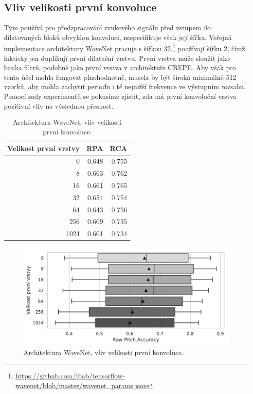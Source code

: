 \subsection{Vliv velikosti první konvoluce}

Tým \cite{Oord2016} používá pro předzpracování zvukového signálu před vstupem do dilatovaných bloků obvyklou konvoluci, nespecifikuje však její šířku. Veřejná implementace architektury WaveNet pracuje s šířkou 32.\footnote{\url{https://github.com/ibab/tensorflow-wavenet/blob/master/wavenet_params.json}} \cite{Martak2018} používají šířku 2, čímž fakticky jen duplikují první dilatační vrstvu. První vrstva může sloužit jako banka filtrů, podobně jako první vrstva v architektuře CREPE. Aby však pro tento účel mohla fungovat plnohodnotně, musela by být široká minimálně 512 vzorků, aby mohla zachytit periodu i té nejnižší frekvence ve výstupním rozsahu. Pomocí sady experimentů se pokusíme zjistit, zda má první konvoluční vrstva pozitivní vliv na výslednou přesnost.


\begin{table}[h!]
\centering
    \begin{tabular}{rrr}
    \toprule
    Velikost první vrstvy &   RPA &   RCA \\
    \midrule
                        0 & 0.648 & 0.755 \\
                        8 & 0.663 & 0.762 \\
                    16 & 0.661 & 0.765 \\
                    32 & 0.654 & 0.754 \\
                    64 & 0.643 & 0.756 \\
                    256 & 0.609 & 0.735 \\
                    1024 & 0.601 & 0.734 \\
    \bottomrule
    \end{tabular}
\caption{Architektura WaveNet, vliv velikosti první konvoluce.}\label{tab:wavenet_first_layer}
\end{table}

\begin{figure}[h]\centering
    \includegraphics[scale=0.6]{../img/figures/wavenet_first_layer_grey}
\caption{Architektura WaveNet, vliv velikosti první konvoluce.}\label{obr:wavenet_first_layer}
\end{figure}

